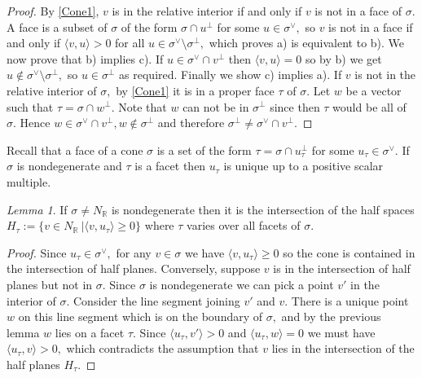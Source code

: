 \documentclass[BSc]{usydthesis}
\numberwithin{equation}{chapter}
\theoremstyle{remark}
\newtheorem{Lemma}[equation]{Lemma}
\newcommand{\R}{\mathbb{R}}
\newcommand{\V}{\vee}
\begin{document}
\begin{proof}
 By \ref{Cone1}, $v$ is in the relative interior if and only if $v$ is not in a face of $\sigma.$ A face is a subset of $\sigma$ of the form $\sigma \cap u^{\perp}$ for some $u\in \sigma^{\V},$ so $v$ is not in a face if and only if $\langle v,u \rangle >0$ for all $u\in \sigma^{\V}\setminus \sigma^{\perp},$ which proves a) is equivalent to b). We now prove that b) implies c). If $u\in \sigma^{\V} \cap v^{\perp}$ then $\langle v,u \rangle =0$ so by b) we get $u\notin \sigma^{\V}\setminus \sigma^{\perp},$ so $u\in \sigma^{\perp}$ as required. Finally we show c) implies a). If $v$ is not in the relative interior of $\sigma,$ by \ref{Cone1} it is in a proper face $\tau$ of $\sigma.$ Let $w$ be a vector such that $\tau = \sigma \cap w^{\perp}.$ Note that $w$ can not be in $\sigma^{\perp}$ since then $\tau$ would be all of $\sigma.$ Hence $w\in \sigma^{\V} \cap v^{\perp}, w\notin \sigma^{\perp}$ and therefore $\sigma^{\perp} \neq \sigma^{\V} \cap v^{\perp}.$ 
\end{proof}

Recall that a face of a cone $\sigma$ is a set of the form $\tau = \sigma \cap u_{\tau}^{\perp}$ for some $u_{\tau} \in \sigma^{\V}.$ If $\sigma$ is nondegenerate and $\tau$ is a facet then $u_{\tau}$ is unique up to a positive scalar multiple. 

\begin{Lemma}\label{Eight} If $\sigma\neq N_{\R}$ is nondegenerate then it is the intersection of the half spaces $H_{\tau}:= \{ v \in N_{\R} \ | \langle v, u_{\tau}\rangle \geq 0 \}$ where $\tau$ varies over all facets of $\sigma.$
\end{Lemma}

\begin{proof}
 Since $u_{\tau} \in \sigma^{\V},$ for any $v\in \sigma$ we have $\langle v , u_{\tau} \rangle \geq 0$ so the cone is contained in the intersection of half planes. Conversely, suppose $v$ is in the intersection of half planes but not in $\sigma.$ Since $\sigma$ is nondegenerate we can pick a point $v'$ in the interior of $\sigma.$ Consider the line segment joining $v'$ and $v.$ There is a unique point $w$ on this line segment which is on the boundary of $\sigma,$ and by the previous lemma $w$ lies on a facet $\tau.$ Since $\langle u_{\tau} , v' \rangle > 0$ and $\langle u_{\tau} ,w \rangle=0$ we must have $\langle u_{\tau}, v \rangle >0,$ which contradicts the assumption that $v$ lies in the intersection of the half planes $H_{\tau}.$
\end{proof}
\end{document}
